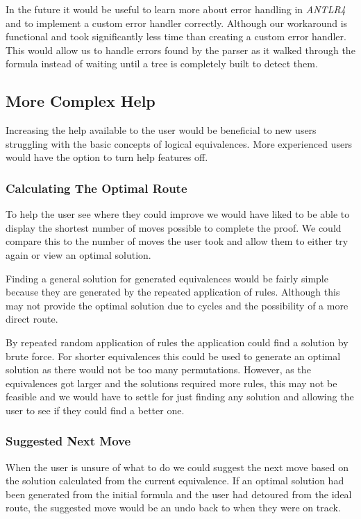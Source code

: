 \documentclass{report}
\begin{document}
In the future it would be useful to learn more about error handling in \emph{ANTLR4} and to implement a custom error handler correctly. Although our workaround is functional and took significantly less time than creating a custom error handler. This would allow us to handle errors found by the parser as it walked through the formula instead of waiting until a tree is completely built to detect them. 

\subsection{More Complex Help}

Increasing the help available to the user would be beneficial to new users struggling with the basic concepts of logical equivalences. More experienced users would have the option to turn help features off.

\subsubsection{Calculating The Optimal Route}

To help the user see where they could improve we would have liked to be able to display the shortest number of moves possible to complete the proof. We could compare this to the number of moves the user took and allow them to either try again or view an optimal solution.

Finding a general solution for generated equivalences would be fairly simple because they are generated by the repeated application of rules. Although this may not provide the optimal solution due to cycles and the possibility of a more direct route.

By repeated random application of rules the application could find a solution by brute force. For shorter equivalences this could be used to generate an optimal solution as there would not be too many permutations. However, as the equivalences got larger and the solutions required more rules, this may not be feasible and we would have to settle for just finding any solution and allowing the user to see if they could find a better one.

\subsubsection{Suggested Next Move}

When the user is unsure of what to do we could suggest the next move based on the solution calculated from the current equivalence. If an optimal solution had been generated from the initial formula and the user had detoured from the ideal route, the suggested move would be an undo back to when they were on track.
\end{document}
